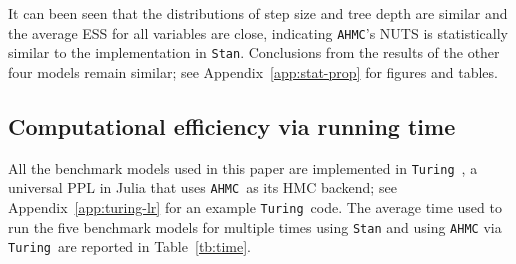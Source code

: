 \documentclass[tablecaption=bottom,wcp]{jmlr} %
\def\ahmc{\texttt{AHMC}}
\def\stan{\texttt{Stan}}
\def\turing{\texttt{Turing}}
\begin{document}
It can been seen that the distributions of step size and tree depth are similar and the average ESS for all variables are close, indicating \ahmc's NUTS is statistically similar to the implementation in \stan. 
Conclusions from the results of the other four models remain similar; see Appendix~\ref{app:stat-prop} for figures and tables.

\subsection{Computational efficiency via running time}
All the benchmark models used in this paper are implemented in \turing~\citep{pmlr-v84-ge18b}, a universal PPL in Julia that
uses \ahmc~as its HMC backend; see Appendix~\ref{app:turing-lr} for an example \turing~code.
The average time used to run the five benchmark models for multiple times using \texttt{Stan} and using \texttt{AHMC} via \turing~are reported in Table~\ref{tb:time}.
\end{document}
